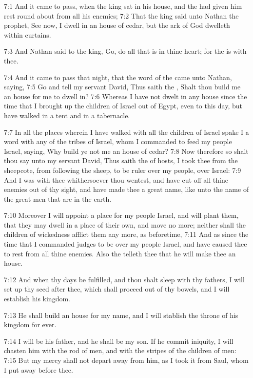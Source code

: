 7:1 And it came to pass, when the king sat in his house, and the \LORD had given him rest round about from all his enemies; 7:2 That the king said unto Nathan the prophet, See now, I dwell in an house of cedar, but the ark of God dwelleth within curtains.

7:3 And Nathan said to the king, Go, do all that is in thine heart; for the \LORD is with thee.

7:4 And it came to pass that night, that the word of the \LORD came unto Nathan, saying, 7:5 Go and tell my servant David, Thus saith the \LORD, Shalt thou build me an house for me to dwell in?  7:6 Whereas I have not dwelt in any house since the time that I brought up the children of Israel out of Egypt, even to this day, but have walked in a tent and in a tabernacle.

7:7 In all the places wherein I have walked with all the children of Israel spake I a word with any of the tribes of Israel, whom I commanded to feed my people Israel, saying, Why build ye not me an house of cedar?  7:8 Now therefore so shalt thou say unto my servant David, Thus saith the \LORD of hosts, I took thee from the sheepcote, from following the sheep, to be ruler over my people, over Israel: 7:9 And I was with thee whithersoever thou wentest, and have cut off all thine enemies out of thy sight, and have made thee a great name, like unto the name of the great men that are in the earth.

7:10 Moreover I will appoint a place for my people Israel, and will plant them, that they may dwell in a place of their own, and move no more; neither shall the children of wickedness afflict them any more, as beforetime, 7:11 And as since the time that I commanded judges to be over my people Israel, and have caused thee to rest from all thine enemies. Also the \LORD telleth thee that he will make thee an house.

7:12 And when thy days be fulfilled, and thou shalt sleep with thy fathers, I will set up thy seed after thee, which shall proceed out of thy bowels, and I will establish his kingdom.

7:13 He shall build an house for my name, and I will stablish the throne of his kingdom for ever.

7:14 I will be his father, and he shall be my son. If he commit iniquity, I will chasten him with the rod of men, and with the stripes of the children of men: 7:15 But my mercy shall not depart away from him, as I took it from Saul, whom I put away before thee.

